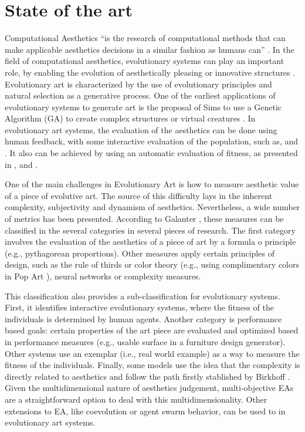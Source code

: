 \documentclass[conference]{IEEEtran}
\begin{document}
\section{State of the art}
\label{sec:soa}
Computational Aesthetics ``is the research of computational methods that can make applicable aesthetics decisions in a similar fashion as humans can'' \cite{COMPAESTH}. In the field of computational aesthetics, evolutionary systems can play an important role, by enabling the evolution of aesthetically pleasing or innovative structures \cite{dipaola2009incorporating}. Evolutionary art is characterized by the use of evolutionary principles and natural selection as a generative process. One of the earliest applications of evolutionary systems to generate art is the proposal of Sims to use a Genetic Algorithm (GA) to create complex structures \cite{sims1991artificial} or virtual creatures  \cite{sims1994evolving}. In evolutionary art systems, the evaluation of the aesthetics can be done using human feedback, with some interactive evaluation of the population, such as, \cite{ashlock2006evolutionary,draves2006electric,moroni2000vox,sims1991artificial} and \cite{ takagi2001interactive}. It also can be achieved by using an automatic evaluation of fitness, as presented in \cite{aguilar2008robotic,del2005benford,den2010comparing,dipaola2009incorporating,li2012investigating,machado1998computing}, and \cite{sims1994evolving}.

One of the main challenges in Evolutionary Art is how to measure aesthetic value of a piece of evolutive art. The source of this difficulty lays in the inherent complexity, subjectivity and dynamism of aesthetics. Nevertheless, a wide number of metrics has been presented. According to Galanter \cite{galanter2012computational}, these measures can be classified in the several categories in several pieces of research. The first category involves the evaluation of the aesthetics of a piece of art by a formula o principle (e.g., pythagorean proportions). Other measures apply certain principles of design, such as the rule of thirds or color theory (e.g., using complimentary colors in Pop Art \cite{den2012evolving}), neural networks or complexity measures. 

This classification also provides a sub-classification for evolutionary systems. First, it identifies interactive evolutionary systems, where the fitness of the individuals is determined by human agents. Another category is performance based goals: certain properties of the art piece are evaluated and optimized based in performance measures (e.g., usable surface in a furniture design generator). Other systems use an exemplar (i.e., real world example) as a way to measure the fitness of the individuals. Finally, some models use the idea that the complexity is directly related to aesthetics and follow the path firstly stablished by Birkhoff \cite{birkhoff2003aesthetic}.  Given the multidimensional nature of aesthetics judgement, multi-objective EAs are a straightforward option to deal with this multidimensionality. Other extensions to EA, like coevolution or agent swarm behavior, can be used to in evolutionary art systems.
\end{document}
